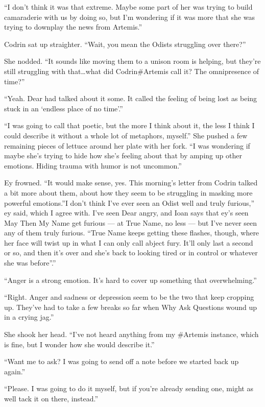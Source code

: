 ``I don't think it was that extreme. Maybe some part of her was trying to build camaraderie with us by doing so, but I'm wondering if it was more that she was trying to downplay the news from Artemis.''

Codrin sat up straighter. ``Wait, you mean the Odists struggling over there?''

She nodded. ``It sounds like moving them to a unison room is helping, but they're still struggling with that\ldots what did Codrin\#Artemis call it? The omnipresence of time?''

``Yeah. Dear had talked about it some. It called the feeling of being lost as being stuck in an `endless place of no time'.''

``I was going to call that poetic, but the more I think about it, the less I think I could describe it without a whole lot of metaphors, myself.'' She pushed a few remaining pieces of lettuce around her plate with her fork. ``I was wondering if maybe she's trying to hide how she's feeling about that by amping up other emotions. Hiding trauma with humor is not uncommon.''

Ey frowned. ``It would make sense, yes. This morning's letter from Codrin talked a bit more about them, about how they seem to be struggling in masking more powerful emotions.''I don't think I've ever seen an Odist well and truly furious,'' ey said, which I agree with. I've seen Dear angry, and Ioan says that ey's seen May Then My Name get furious — at True Name, no less — but I've never seen any of them truly furious. ``True Name keeps getting these flashes, though, where her face will twist up in what I can only call abject fury. It'll only last a second or so, and then it's over and she's back to looking tired or in control or whatever she was before''.''

``Anger is a strong emotion. It's hard to cover up something that overwhelming.''

``Right. Anger and sadness or depression seem to be the two that keep cropping up. They've had to take a few breaks so far when Why Ask Questions wound up in a crying jag.''

She shook her head. ``I've not heard anything from my \#Artemis instance, which is fine, but I wonder how she would describe it.''

``Want me to ask? I was going to send off a note before we started back up again.''

``Please. I was going to do it myself, but if you're already sending one, might as well tack it on there, instead.''

